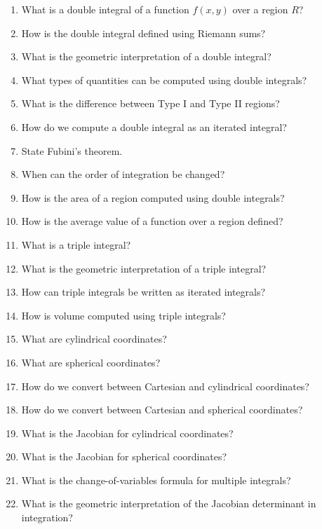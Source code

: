 \begin{enumerate}[resume]
  \item What is a double integral of a function $f(x,y)$ over a region $R$?
  \item How is the double integral defined using Riemann sums?
  \item What is the geometric interpretation of a double integral?
  \item What types of quantities can be computed using double integrals?
  \item What is the difference between Type I and Type II regions?
  \item How do we compute a double integral as an iterated integral?
  \item State Fubini's theorem.
  \item When can the order of integration be changed?
  \item How is the area of a region computed using double integrals?
  \item How is the average value of a function over a region defined?
  \item What is a triple integral?
  \item What is the geometric interpretation of a triple integral?
  \item How can triple integrals be written as iterated integrals?
  \item How is volume computed using triple integrals?
  \item What are cylindrical coordinates?
  \item What are spherical coordinates?
  \item How do we convert between Cartesian and cylindrical coordinates?
  \item How do we convert between Cartesian and spherical coordinates?
  \item What is the Jacobian for cylindrical coordinates?
  \item What is the Jacobian for spherical coordinates?
  \item What is the change-of-variables formula for multiple integrals?
  \item What is the geometric interpretation of the Jacobian determinant in integration?
\end{enumerate}
